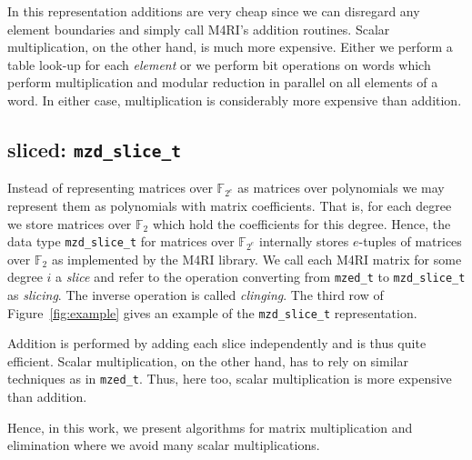 \documentclass{sig-alternate}
\newcommand{\ring}[1]{\mathbb{#1}}
\newcommand{\FZ}{\ensuremath{\ring{F}_2}\xspace}
\newcommand{\FZE}{\ensuremath{\ring{F}_{2^e}}\xspace}
\newcommand{\mzedt}{\texttt{mzed\-\_t}\xspace}
\newcommand{\mzdslicet}{\texttt{mzd\-\_slice\-\_t}\xspace}
\begin{document}
In this representation additions are very cheap since we can disregard any element boundaries and simply call M4RI's addition routines. Scalar multiplication, on the other hand, is much more expensive. Either we perform a table look-up for each \emph{element} or we perform bit operations on words which perform multiplication and modular reduction in parallel on all elements of a word. In either case, multiplication is considerably more expensive than addition.

\subsection{sliced: \mzdslicet} \label{sec:bitsliced}

Instead of representing matrices over \FZE as matrices over polynomials we may represent them as polynomials with matrix coefficients. That is, for each degree we store matrices over \FZ which hold the coefficients for this degree. Hence,  the data type \mzdslicet for matrices over $\FZE$ internally stores $e$-tuples of matrices over \FZ as implemented by the M4RI library. We call each M4RI matrix for some degree $i$ a \emph{slice} and refer to the operation converting from \mzedt to \mzdslicet as \emph{slicing}. The inverse operation is called \emph{clinging}. The third row of Figure~\ref{fig:example} gives an example of the \mzdslicet representation.

Addition is performed by adding each slice independently and is thus quite efficient. Scalar multiplication, on the other hand, has to rely on similar techniques as in \mzedt. Thus, here too, scalar multiplication is more expensive than addition.

Hence, in this work, we present algorithms for matrix multiplication and elimination where we avoid many scalar multiplications.
\end{document}
